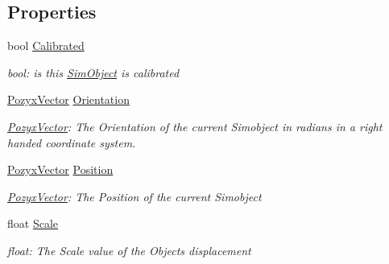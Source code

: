 \subsection*{Properties}
\begin{DoxyCompactItemize}
\item 
bool \hyperlink{class_pozyx_positioner_1_1_framework_1_1_sim_object_a6bcf32032872002b9edb17f0efc86eef}{Calibrated}
\begin{DoxyCompactList}\small\item\em bool\+: is this \hyperlink{class_pozyx_positioner_1_1_framework_1_1_sim_object}{Sim\+Object} is calibrated \end{DoxyCompactList}\item 
\hyperlink{struct_pozyx_positioner_1_1_framework_1_1_pozyx_vector}{Pozyx\+Vector} \hyperlink{class_pozyx_positioner_1_1_framework_1_1_sim_object_af589d7d7066efe823f8a2decd5b081da}{Orientation}
\begin{DoxyCompactList}\small\item\em \hyperlink{struct_pozyx_positioner_1_1_framework_1_1_pozyx_vector}{Pozyx\+Vector}\+: The Orientation of the current Simobject in radians in a right handed coordinate system. \end{DoxyCompactList}\item 
\hyperlink{struct_pozyx_positioner_1_1_framework_1_1_pozyx_vector}{Pozyx\+Vector} \hyperlink{class_pozyx_positioner_1_1_framework_1_1_sim_object_a1d2b2ac8c37883939483d4682826db21}{Position}
\begin{DoxyCompactList}\small\item\em \hyperlink{struct_pozyx_positioner_1_1_framework_1_1_pozyx_vector}{Pozyx\+Vector}\+: The Position of the current Simobject \end{DoxyCompactList}\item 
float \hyperlink{class_pozyx_positioner_1_1_framework_1_1_sim_object_ab9f89c4e327e25286f0269960d0d2de8}{Scale}
\begin{DoxyCompactList}\small\item\em float\+: The Scale value of the Object\textquotesingle{}s displacement \end{DoxyCompactList}\end{DoxyCompactItemize}


